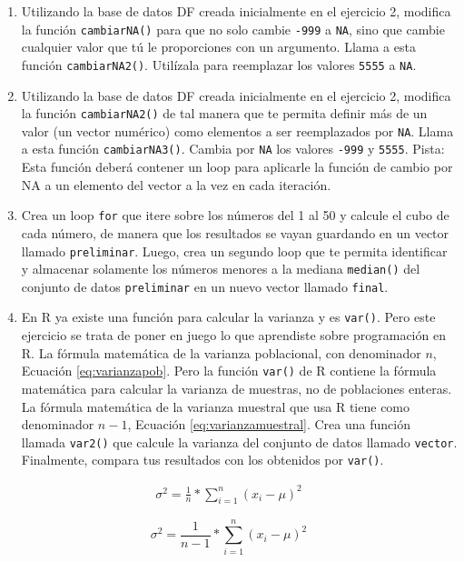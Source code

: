 \documentclass[
]{article}
\theoremstyle{definition}
\theoremstyle{definition}
\theoremstyle{definition}
\theoremstyle{definition}
\theoremstyle{remark}
\begin{document}
\begin{enumerate}
\def\labelenumi{\arabic{enumi}.}
\item
  Utilizando la base de datos DF creada inicialmente en el ejercicio 2, modifica la función \texttt{cambiarNA()} para que no solo cambie \texttt{-999} a \texttt{NA}, sino que cambie cualquier valor que tú le proporciones con un argumento. Llama a esta función \texttt{cambiarNA2()}. Utilízala para reemplazar los valores \texttt{5555} a \texttt{NA}.
\item
  Utilizando la base de datos DF creada inicialmente en el ejercicio 2, modifica la función \texttt{cambiarNA2()} de tal manera que te permita definir más de un valor (un vector numérico) como elementos a ser reemplazados por \texttt{NA}. Llama a esta función \texttt{cambiarNA3()}. Cambia por \texttt{NA} los valores \texttt{-999} y \texttt{5555}. Pista: Esta función deberá contener un loop para aplicarle la función de cambio por NA a un elemento del vector a la vez en cada iteración.
\item
  Crea un loop \texttt{for} que itere sobre los números del 1 al 50 y calcule el cubo de cada número, de manera que los resultados se vayan guardando en un vector llamado \texttt{preliminar}. Luego, crea un segundo loop que te permita identificar y almacenar solamente los números menores a la mediana \texttt{median()} del conjunto de datos \texttt{preliminar} en un nuevo vector llamado \texttt{final}.
\item
  En R ya existe una función para calcular la varianza y es \texttt{var()}. Pero este ejercicio se trata de poner en juego lo que aprendiste sobre programación en R. La fórmula matemática de la varianza poblacional, con denominador \(n\), Ecuación \eqref{eq:varianzapob}. Pero la función \texttt{var()} de R contiene la fórmula matemática para calcular la varianza de muestras, no de poblaciones enteras. La fórmula matemática de la varianza muestral que usa R tiene como denominador \(n-1\), Ecuación \eqref{eq:varianzamuestral}. Crea una función llamada \texttt{var2()} que calcule la varianza del conjunto de datos llamado \texttt{vector}. Finalmente, compara tus resultados con los obtenidos por \texttt{var()}.
\end{enumerate}

\begin{align}
  \sigma^2 = \frac{1}{n}*{\displaystyle\sum_{i=1}^{n}(x_i - \mu)^2} \label{eq:varianzapob}
  \end{align}

\begin{equation}
  \sigma^2 = \frac{1}{n-1}*{\displaystyle\sum_{i=1}^{n}(x_i - \mu)^2} \label{eq:varianzamuestral}
  \end{equation}
\end{document}
